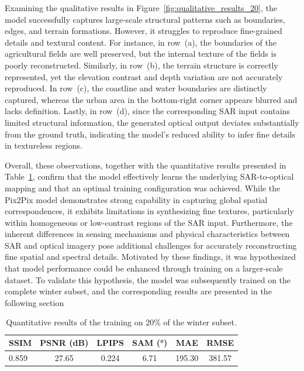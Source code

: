 Examining the qualitative results in Figure~\ref{fig:qualitative_results_20}, the model successfully captures large-scale structural patterns such as boundaries, edges, and terrain formations. However, it struggles to reproduce fine-grained details and textural content. For instance, in row~(a), the boundaries of the agricultural fields are well preserved, but the internal texture of the fields is poorly reconstructed. Similarly, in row~(b), the terrain structure is correctly represented, yet the elevation contrast and depth variation are not accurately reproduced. In row~(c), the coastline and water boundaries are distinctly captured, whereas the urban area in the bottom-right corner appears blurred and lacks definition. Lastly, in row~(d), since the corresponding SAR input contains limited structural information, the generated optical output deviates substantially from the ground truth, indicating the model’s reduced ability to infer fine details in textureless regions.


Overall, these observations, together with the quantitative results presented in Table~\ref{tab:quantitative_result_20}, confirm that the model effectively learns the underlying SAR-to-optical mapping and that an optimal training configuration was achieved. While the Pix2Pix model demonstrates strong capability in capturing global spatial correspondences, it exhibits limitations in synthesizing fine textures, particularly within homogeneous or low-contrast regions of the SAR input. Furthermore, the inherent differences in sensing mechanisms and physical characteristics between SAR and optical imagery pose additional challenges for accurately reconstructing fine spatial and spectral details. Motivated by these findings, it was hypothesized that model performance could be enhanced through training on a larger-scale dataset. To validate this hypothesis, the model was subsequently trained on the complete winter subset, and the corresponding results are presented in the following section

\begin{table}[!htbp]
\centering
\caption[Quantitative results of 20\% training winter subset]{Quantitative results of the training on 20\% of the winter subset.}
\begin{tabular}{lccccc}
\toprule
\textbf{SSIM} & \textbf{PSNR (dB)} & \textbf{LPIPS} & \textbf{SAM (°)} & \textbf{MAE} & \textbf{RMSE} \\
\midrule
0.859 & 27.65 & 0.224 & 6.71 & 195.30 & 381.57 \\
\bottomrule
\end{tabular}
\label{tab:quantitative_result_20}
\end{table}

